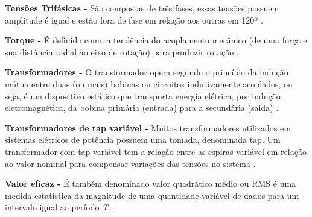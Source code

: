 \noindent
\textbf{Tensões Trifásicas -} São compostas de três fases, essas tensões possuem amplitude é igual e estão fora de fase em relação aos outras em 120º \cite{SAD03}.

\noindent
\textbf{Torque -} É definido como a tendência do acoplamento mecânico (de uma força e sua distância radial ao eixo de rotação) para produzir rotação \cite{KOS93}. 

\noindent
\textbf{Transformadores -} O transformador opera segundo o princípio da indução mútua entre duas (ou mais) bobinas ou circuitos indutivamente acoplados, ou seja, é um dispositivo estático que transporta energia elétrica, por indução eletromagnética, da bobina primária (entrada) para a secundária (saída) \cite{KOS93}. 

\noindent
\textbf{Transformadores de tap variável -} Muitos transformadores utilizados em sistemas elétricos de potência possuem uma tomada, denominada tap. Um transformador com tap variável tem a relação entre as espiras variável em relação ao valor nominal para compensar variações das tensões no sistema \cite{FER11}.

\noindent
\textbf{Valor eficaz -} É também denominado valor quadrático médio ou RMS é uma medida estatística da magnitude de uma quantidade variável de dados para um intervalo igual ao período \textit{T} \cite{BOY04}.